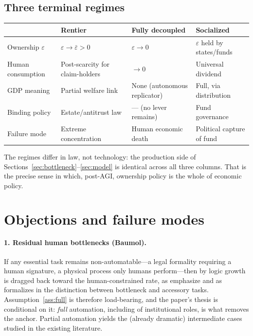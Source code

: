 \documentclass[11pt]{article}
\newcommand{\eps}{\varepsilon}
\begin{document}
\subsection{Three terminal regimes}

\begin{center}
\begin{tabular}{@{}p{2.6cm}p{3.4cm}p{3.4cm}p{3.6cm}@{}}
\toprule
 & \textbf{Rentier} & \textbf{Fully decoupled} & \textbf{Socialized} \\
\midrule
Ownership $\eps$ & $\eps \to \bar\eps > 0$ & $\eps \to 0$ & $\eps$ held by states/funds \\
Human consumption & Post-scarcity for claim-holders & $\to 0$ & Universal dividend \\
GDP meaning & Partial welfare link & None (autonomous replicator) & Full, via distribution \\
Binding policy & Estate/antitrust law & --- (no lever remains) & Fund governance \\
Failure mode & Extreme concentration & Human economic death & Political capture of fund \\
\bottomrule
\end{tabular}
\end{center}

\noindent The regimes differ in law, not technology: the production side of Sections~\ref{sec:bottleneck}--\ref{sec:model} is identical across all three columns. That is the precise sense in which, post-AGI, ownership policy is the whole of economic policy.

\section{Objections and failure modes}\label{sec:objections}

\paragraph{1. Residual human bottlenecks (Baumol).} If any essential task remains non-automatable---a legal formality requiring a human signature, a physical process only humans perform---then by \citet{baumol1967} logic growth is dragged back toward the human-constrained rate, as \citet{aghion2019} emphasize and as \citet{restrepo2025} formalizes in the distinction between bottleneck and accessory tasks. Assumption~\ref{ass:full} is therefore load-bearing, and the paper's thesis is conditional on it: \emph{full} automation, including of institutional roles, is what removes the anchor. Partial automation yields the (already dramatic) intermediate cases studied in the existing literature.
\end{document}

